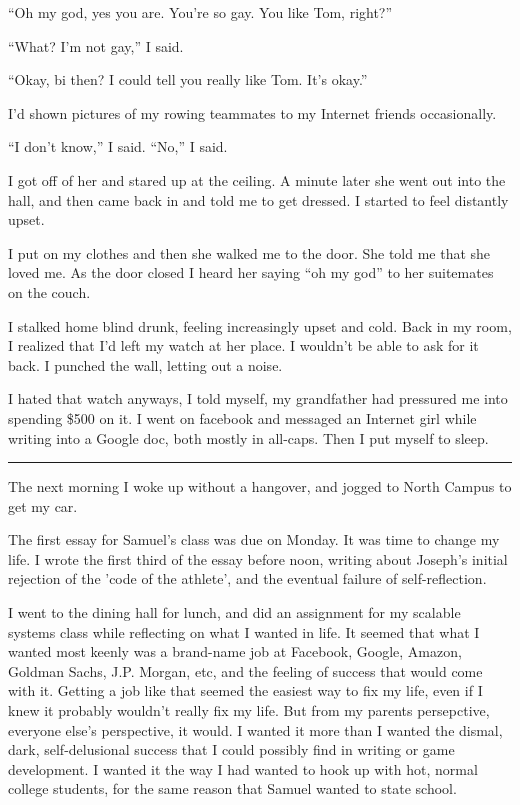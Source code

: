 ``Oh my god, yes you are.  You're so gay.  You like Tom, right?''

``What?  I'm not gay,'' I said.

``Okay, bi then?  I could tell you really like Tom.  It's okay.''

I'd shown pictures of my rowing teammates to my Internet friends occasionally.

``I don't know,'' I said.  ``No,'' I said.

I got off of her and stared up at the ceiling.  A minute later she went out into
the hall, and then came back in and told me to get dressed.  I started to feel
distantly upset.

I put on my clothes and then she walked me to the door.  She told me that she
loved me.  As the door closed I heard her saying ``oh my god'' to her suitemates
on the couch.

I stalked home blind drunk, feeling increasingly upset and cold.  Back in my
room, I realized that I'd left my watch at her place.  I wouldn't be able to ask
for it back.  I punched the wall, letting out a noise.  

I hated that watch anyways, I told myself, my grandfather had pressured me into
spending \$500 on it.  I went on facebook and messaged an Internet girl while
writing into a Google doc, both mostly in all-caps.  Then I put myself to sleep.

\plainfancybreak{12pt}{2}{* * *}

The next morning I woke up without a hangover, and jogged to North Campus to get
my car.  

The first essay for Samuel's class was due on Monday.  It was time to change my
life.  I wrote the first third of the essay before noon, writing about Joseph's
initial rejection of the 'code of the athlete', and the eventual failure of
self-reflection.

I went to the dining hall for lunch, and did an assignment for my scalable
systems class while reflecting on what I wanted in life.  It seemed that what I
wanted most keenly was a brand-name job at Facebook, Google, Amazon, Goldman
Sachs, J.P.  Morgan, etc, and the feeling of success that would come with it.
Getting a job like that seemed the easiest way to fix my life, even if I knew it
probably wouldn't really fix my life.  But from my parents persepctive, everyone
else's perspective, it would.  I wanted it more than I wanted the dismal, dark,
self-delusional success that I could possibly find in writing or game
development.  I wanted it the way I had wanted to hook up with hot, normal
college students, for the same reason that Samuel wanted to state school. 

